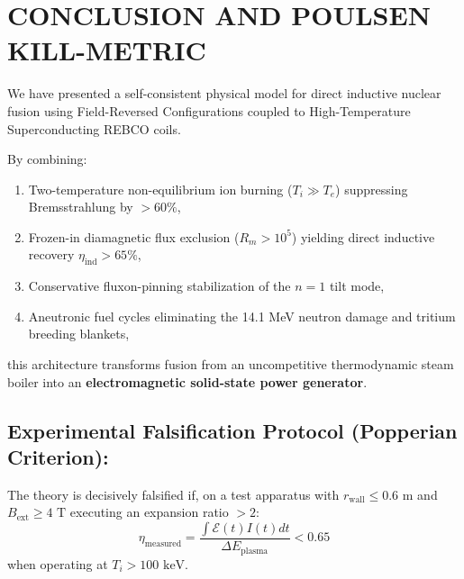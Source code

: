 \documentclass[10pt,twocolumn]{article}
\begin{document}
\section{CONCLUSION AND POULSEN KILL-METRIC}

We have presented a self-consistent physical model for direct inductive nuclear fusion using Field-Reversed Configurations coupled to High-Temperature Superconducting REBCO coils.

By combining:
\begin{enumerate}
  \item Two-temperature non-equilibrium ion burning ($T_i \gg T_e$) suppressing Bremsstrahlung by $> 60\%$,
  \item Frozen-in diamagnetic flux exclusion ($R_m > 10^5$) yielding direct inductive recovery $\eta_{\text{ind}} > 65\%$,
  \item Conservative fluxon-pinning stabilization of the $n=1$ tilt mode,
  \item Aneutronic fuel cycles eliminating the 14.1 MeV neutron damage and tritium breeding blankets,
\end{enumerate}

this architecture transforms fusion from an uncompetitive thermodynamic steam boiler into an \textbf{electromagnetic solid-state power generator}.


\subsection{Experimental Falsification Protocol (Popperian Criterion):}
The theory is decisively falsified if, on a test apparatus with $r_{\text{wall}} \le 0.6\text{ m}$ and $B_{\text{ext}} \ge 4\text{ T}$ executing an expansion ratio $> 2$:
\begin{equation}
  \eta_{\text{measured}} = \frac{\int \mathcal{E}(t) I(t) dt}{\Delta E_{\text{plasma}}} < 0.65
\end{equation}
when operating at $T_i > 100\text{ keV}$.
\end{document}
